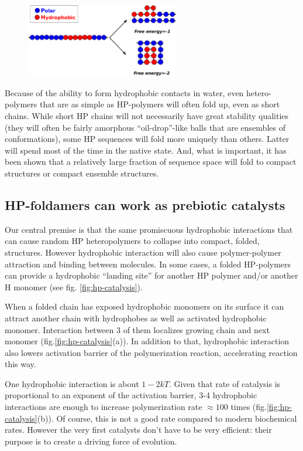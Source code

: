 \documentclass[12pt]{paper}
\begin{document}
\begin{figure}[h!]
  \centering
  \includegraphics[width=0.6\textwidth]{pictures/hp-model.pdf} 
  \caption{}
  \label{fig:hp-model}
\end{figure}
Because of the ability to form hydrophobic contacts in water, even hetero-polymers that 
are as simple as HP-polymers will often fold up, even as short chains. 
While short HP chains will not necessarily have great stability qualities (they will often be 
fairly amorphous ``oil-drop''-like balls that are ensembles of conformations), some HP 
sequences will fold more uniquely than others. Latter will spend most of the time in the native 
state. And, what is important, it has been shown that a 
relatively large fraction of sequence space will fold to compact structures or compact ensemble 
structures\cite{lau1989lattice}.

\subsection{HP-foldamers can work as prebiotic catalysts}
Our central premise is that the same promiscuous hydrophobic interactions that can cause random 
HP heteropolymers to collapse into compact, folded, structures. However hydrophobic 
interaction will also cause polymer-polymer attraction and binding between molecules.  In some 
cases, a folded HP-polymers can provide a hydrophobic ``landing site'' for another HP polymer 
and/or another H monomer (see fig. \ref{fig:hp-catalysis}).  


When a folded chain has exposed hydrophobic monomers on its surface it can attract another chain 
with hydrophobes as well as activated hydrophobic monomer. Interaction between 3 of them localizes 
growing chain and next monomer (fig.\ref{fig:hp-catalysis}(a)). In addition to that, hydrophobic 
interaction also lowers activation barrier of the polymerization reaction, accelerating reaction 
this way.

One hydrophobic interaction is about $1-2kT$. Given that rate of catalysis is proportional to an 
exponent of the activation barrier, 3-4 hydrophobic interactions are enough to increase 
polymerization rate $\approx 100$ times (fig.\ref{fig:hp-catalysis}(b)). 
Of course, this is not a good rate compared to modern biochemical rates. However the very 
first catalysts don't have to be very efficient: their purpose is to create a driving force of 
evolution.
\end{document}
